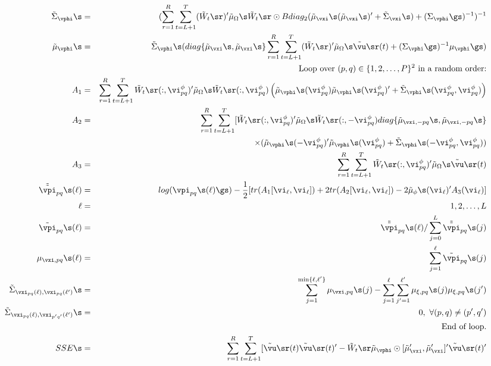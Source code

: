 \begin{eqnarray*}
\tilde{\Sigma}_{\vphi}\s&=& (\sum_{r=1}^R\sum_{t=L+1}^{T}(\tilde{W}_t\sr)'\tilde{\mu}_{\Omega}\s\tilde{W}_t\sr\odot Bdiag_2(\tilde{\mu}_{\vxi}\s(\tilde{\mu}_{\vxi}\s)' + \tilde{\Sigma}_{\vxi}\s) +(\Sigma_{\vphi}\gs)^{-1})^{-1} \\
\tilde{\mu}_{\vphi}\s &=& \tilde{\Sigma}_{\vphi}\s(diag\{\tilde{\mu}_{\vxi}\s,\tilde{\mu}_{\vxi}\s\}\sum_{r=1}^{R}\sum_{t=L+1}^{T}(\tilde{W}_t\sr)'\tilde{\mu}_{\Omega}\s\tilde{\vu}\sr(t)+(\Sigma_{\vphi}\gs)^{-1}\mu_{\vphi}\gs)\\
\nonumber
&&\text{Loop over $(p,q)\in \{1,2,\dots, P\}^2$ in a random order:}\\
A_1 &=& \sum_{r=1}^{R}\sum_{t=L+1}^{T}\tilde{W}_t\sr(:,\vi^{\phi}_{pq})'\tilde{\mu}_{\Omega}\s\tilde{W}_t\sr(:,\vi^{\phi}_{pq})\left(\tilde{\mu}_{\vphi}\s(\vi^{\phi}_{pq})\tilde{\mu}_{\vphi}\s(\vi^{\phi}_{pq})' + \tilde{\Sigma}_{\vphi}\s(\vi^{\phi}_{pq}, \vi^{\phi}_{pq}) \right)\\
A_2 &=& \sum_{r=1}^{R}\sum_{t=L+1}^{T}[\tilde{W}_t\sr(:, \vi^{\phi}_{pq})'\tilde{\mu}_{\Omega}\s\tilde{W}_t\sr(:, -\vi^{\phi}_{pq}) diag\{\tilde{\mu}_{\vxi,-pq}\s, \tilde{\mu}_{\vxi,-pq}\s\} \\
&&\times (\tilde{\mu}_{\vphi}\s(-\vi^{\phi}_{pq})'\tilde{\mu}_{\vphi}\s(\vi^{\phi}_{pq})
+\tilde{\Sigma}_{\vphi}\s(-\vi^{\phi}_{pq}, \vi^{\phi}_{pq}))\\
A_3 &=& \sum_{r=1}^{R}\sum_{t=L+1}^{T}\tilde{W}_t\sr(:, \vi^{\phi}_{pq})'\tilde{\mu}_{\Omega}\s \tilde{\vu}\sr(t)\\
\tilde{\tilde{\vpi}}_{pq}\s(\ell)&= & log(\vpi_{pq}\s(\ell)\gs) -\frac{1}{2}[ tr(A_1[\vi_{\ell},\vi_{\ell}]) + 2tr(A_2[\vi_{\ell},\vi_{\ell}]) - 2\tilde{\mu}_{\phi}\s(\vi_{\ell})'A_3(\vi_{\ell})]\\
\ell&=&1,2,\dots, L\\
\tilde{\vpi}_{pq}\s(\ell) &=& \tilde{\tilde{\vpi}}_{pq}\s(\ell)/\sum_{j=0}^L \tilde{\tilde{\vpi}}_{pq}\s(j)\\ 
\mu_{\vxi,pq}\s(\ell) &=& \sum_{j=1}^{\ell}\tilde{\vpi}_{pq}\s(j)\\
\tilde{\Sigma}_{\vxi_{pq}(\ell), \vxi_{pq}(\ell')}\s &=& \sum_{j=1}^{\min\{\ell,\ell'\}}\mu_{\vxi, pq}\s(j) - \sum_{j=1}^{\ell}\sum_{j'=1}^{\ell'}\mu_{\xi,pq}\s(j)\mu_{\xi,pq}\s(j')\\ 
\tilde{\Sigma}_{\vxi_{pq}(\ell),\vxi_{p'q'}(\ell')}\s &=& 0, ~\forall (p,q)\ne(p',q')\\
\nonumber 
&&\text{End of loop.}\\
\label{SSE}
SSE\s &=& \sum_{r=1}^{R}\sum_{t=L+1}^{T}[\tilde{\vu}\sr(t)\tilde{\vu}\sr(t)' - \tilde{W}_t\sr\tilde{\mu}_{\vphi}\odot [\tilde{\mu}_{\vxi}', \tilde{\mu}_{\vxi}']'\tilde{\vu}\sr(t)' \\

\end{eqnarray*}
